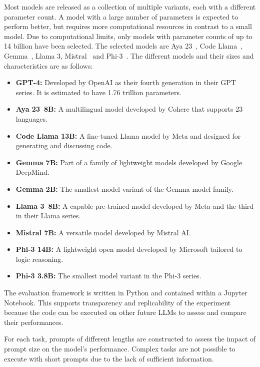 Most models are released as a collection of multiple variants, each with a different parameter count.
A model with a large number of parameters is expected to perform better, but requires more computational resources
in contrast to a small model.
Due to computational limits, only models with parameter counts of up to 14 billion have been selected.
The selected models are Aya 23\ \citep{aryabumi2024aya}, Code Llama\ \citep{roziere2023code},
Gemma\ \citep{team2024gemma}, Llama 3, Mistral\ \citep{jiang2023mistral} and Phi-3\ \citep{abdin2024phi}.
The different models and their sizes and characteristics are as follows:
\begin{itemize}
    \item \textbf{GPT-4:} Developed by OpenAI as their fourth generation in their GPT series.
    It is estimated to have 1.76 trillion parameters.
    \item \textbf{Aya 23\ 8B:} A multilingual model developed by Cohere that supports 23 languages.
    \item \textbf{Code Llama 13B:} A fine-tuned Llama model by Meta and designed for generating and discussing code.
    \item \textbf{Gemma 7B:} Part of a family of lightweight models developed by Google DeepMind.
    \item \textbf{Gemma 2B:} The smallest model variant of the Gemma model family.
    \item \textbf{Llama 3\ 8B:} A capable pre-trained model developed by Meta and the third in their Llama series.
    \item \textbf{Mistral 7B:} A versatile model developed by Mistral AI\@.
    \item \textbf{Phi-3 14B:} A lightweight open model developed by Microsoft tailored to logic reasoning.
    \item \textbf{Phi-3 3.8B:} The smallest model variant in the Phi-3 series.
\end{itemize}

The evaluation framework is written in Python and contained within a Jupyter Notebook.
This supports transparency and replicability of the experiment because the code can be executed on other future LLMs to
assess and compare their performances.

For each task, prompts of different lengths are constructed to assess the impact of prompt size on the model's
performance.
Complex tasks are not possible to execute with short prompts due to the lack of sufficient information.

